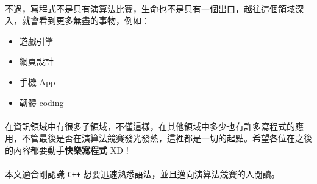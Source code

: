 \documentclass[12pt,a4paper,oneside]{article}
\begin{document}
\begin{CJK}{UTF8}{bkai}
\paragraph{}不過，寫程式不是只有演算法比賽，生命也不是只有一個出口，越往這個領域深入，就會看到更多無盡的事物，例如：
\begin{itemize}
\item 遊戲引擎
\item 網頁設計
\item 手機 App
\item 韌體 coding
\end{itemize}

\paragraph{}在資訊領域中有很多子領域，不僅這樣，在其他領域中多少也有許多寫程式的應用，不管最後是否在演算法競賽發光發熱，這裡都是一切的起點。希望各位在之後的內容都要動手\textbf{快樂寫程式} XD！

\paragraph{}本文適合剛認識 \texttt{C++} 想要迅速熟悉語法，並且邁向演算法競賽的人閱讀。

\ifx \allfiles \undefined

\printindex

\clearpage
\end{CJK}
\end{document}
